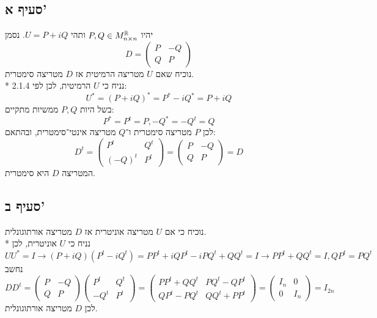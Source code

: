 \subsection{סעיף א'}
יהיו $P, Q \in M^{\mathbb{R}}_{n \times n}$ ותהי $U = P + iQ$. נסמן
\[
	D = \begin{pmatrix}
		P & -Q \\
		Q & P
	\end{pmatrix}
\]
נוכיח שאם $U$ מטריצה הרמיטית אז $D$ מטריצה סימטרית. \\*
נניח כי $U$ הרמיטית, לכן לפי 2.1.4:
\[
	U^* = (P + iQ)^* = P^* - i Q^* = P + i Q
\]
בשל היות $P, Q$ ממשיות מתקיים:
\[
	P^* = P^t = P, -Q^* = -Q^t = Q
\]
לכן $P$ מטריצה סימטרית ו־$Q$ מטריצה אינטי־סימטרית, ובהתאם:
\[
	D^t = \begin{pmatrix}
		P^t & Q^t \\
		(-Q)^t & P^t
	\end{pmatrix}
	= \begin{pmatrix}
		P & -Q \\
		Q & P
	\end{pmatrix}
	= D
\]
המטריצה $D$ היא סימטרית.

\subsection{סעיף ב'}
נוכיח כי אם $U$ מטריצה אוניטרית אז $D$ מטריצה אורתוגונלית. \\*
נניח כי $U$ אוניטרית, לכן
\[
	U U^* = I \rightarrow (P + i Q)(P^t - i Q^t) = P P^t + i Q P^t - i P Q^t + Q Q^t = I \rightarrow PP^t + QQ^t = I, QP^t = PQ^t
\]
נחשב
\[
	D D^t
	= \begin{pmatrix}
		P & -Q \\
		Q & P
	\end{pmatrix} \begin{pmatrix}
		P^t & Q^t \\
		-Q^t & P^t
	\end{pmatrix}
	= \begin{pmatrix}
		PP^t + QQ^t & PQ^t - QP^t \\
		QP^t - PQ^t & QQ^t + PP^t
	\end{pmatrix}
	= \begin{pmatrix}
		I_n & 0 \\
		0 & I_n
	\end{pmatrix}
	= I_{2n}
\]
לכן $D$ מטריצה אורתוגונלית.

